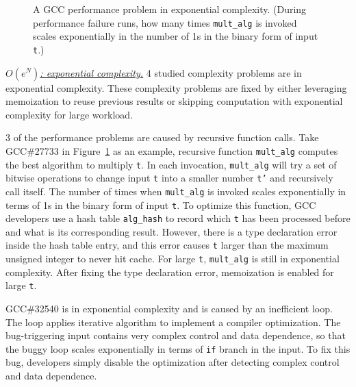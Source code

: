 \begin{figure}
\centering
{}
  \mbox{}
\caption{A GCC performance problem in exponential complexity. 
 (During performance failure runs, how many times \texttt{mult\_alg} is invoked scales exponentially
  in the number of 1s in the binary form of input \texttt{t}.)}
\vspace{-0.05in}
\label{fig:gcc27733}
\vspace{-0.05in}
\end{figure}


{\underline{\textit{$O(e^N)$: exponential complexity.}}}
4 studied complexity problems are in exponential complexity. 
These complexity problems are fixed by 
either leveraging memoization to reuse previous results 
or skipping computation with exponential complexity for large workload. 

3 of the performance problems are caused by recursive function calls. 
Take GCC\#27733 in Figure~\ref{fig:gcc27733} as an example, 
recursive function \texttt{mult\_alg} computes the best algorithm to multiply \texttt{t}.
In each invocation, \texttt{mult\_alg} will try a set of bitwise 
operations to change input 
\texttt{t} into a smaller number \texttt{t'} and recursively call itself. 
The number of times when \texttt{mult\_alg} is invoked scales exponentially 
in terms of 1s in the binary form of input \texttt{t}. 
To optimize this function, 
GCC developers use a hash table \texttt{alg\_hash} to record
which \texttt{t} has been processed before and what is its corresponding result.
However, there is a type declaration error inside the hash table entry,
and this error causes \texttt{t} larger than the maximum unsigned integer to never hit cache.
For large \texttt{t}, \texttt{mult\_alg} is still in exponential complexity. 
After fixing the type declaration error, 
memoization is enabled for large \texttt{t}. 

GCC\#32540 is in exponential complexity and is caused by an inefficient loop. 
The loop applies iterative algorithm to implement a compiler optimization. 
The bug-triggering input contains very complex control and data dependence,  
so that the buggy loop scales exponentially in terms of \texttt{if} branch in the input. 
To fix this bug, developers simply disable the optimization 
after detecting complex control and data dependence.  



